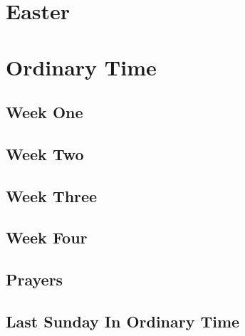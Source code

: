 \documentclass[extrafontsizes,12pt,twoside]{memoir}
\begin{document}
\chapter*[Easter]{Easter}
\clearpage

\clearpage









\chapter*[Ordinary Time]{Ordinary Time}
\clearpage

\section*{Week One}

\section*{Week Two}

\section*{Week Three}

\section*{Week Four}

\section*{Prayers}
\section*{Last Sunday In Ordinary Time}

\end{document}
